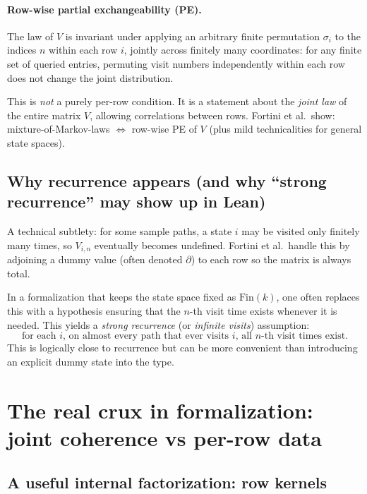 \documentclass[11pt]{article}
\newcommand{\Fin}{\mathrm{Fin}}
\begin{document}
\paragraph{Row-wise partial exchangeability (PE).}
The law of \(V\) is invariant under applying an arbitrary finite permutation \(\sigma_i\) to the indices \(n\) within each row \(i\), jointly across finitely many coordinates:
for any finite set of queried entries, permuting visit numbers independently within each row does not change the joint distribution.

This is \emph{not} a purely per-row condition. It is a statement about the \emph{joint law} of the entire matrix \(V\), allowing correlations between rows.
Fortini et al.\ show: mixture-of-Markov-laws \(\Leftrightarrow\) row-wise PE of \(V\) (plus mild technicalities for general state spaces). \cite{FortiniEtAl2002}

\subsection{Why recurrence appears (and why ``strong recurrence'' may show up in Lean)}

A technical subtlety: for some sample paths, a state \(i\) may be visited only finitely many times, so \(V_{i,n}\) eventually becomes undefined.
Fortini et al.\ handle this by adjoining a dummy value (often denoted \(\partial\)) to each row so the matrix is always total. \cite{FortiniEtAl2002}

In a formalization that keeps the state space fixed as \(\Fin(k)\), one often replaces this with a hypothesis ensuring that the \(n\)-th visit time exists whenever it is needed.
This yields a \emph{strong recurrence} (or \emph{infinite visits}) assumption:
\[
\text{for each \(i\), on almost every path that ever visits \(i\), all \(n\)-th visit times exist.}
\]
This is logically close to recurrence but can be more convenient than introducing an explicit dummy state into the type.

\section{The real crux in formalization: joint coherence vs per-row data}

\subsection{A useful internal factorization: row kernels}
\end{document}
